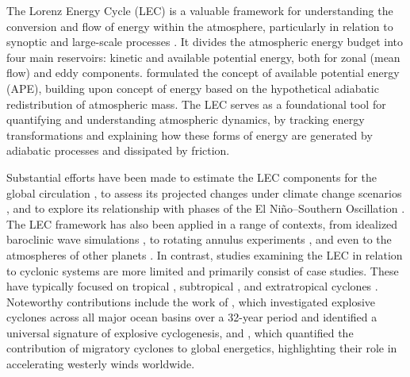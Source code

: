 \documentclass[pdflatex,sn-chicago]{sn-jnl}%
\theoremstyle{plain}
\theoremstyle{definition}
\theoremstyle{remark}
\theoremstyle{definition}
\begin{document}
The Lorenz Energy Cycle (LEC) is a valuable framework for understanding the conversion and flow of energy within the atmosphere, particularly in relation to synoptic and large-scale processes \citep{lorenz1967nature}. It divides the atmospheric energy budget into four main reservoirs: kinetic and available potential energy, both for zonal (mean flow) and eddy components. \citet{lorenz1955available} formulated the concept of available potential energy (APE), building upon \citet{margules1903energie} concept of energy based on the hypothetical adiabatic redistribution of atmospheric mass. The LEC serves as a foundational tool for quantifying and understanding atmospheric dynamics, by tracking energy transformations and explaining how these forms of energy are generated by adiabatic processes and dissipated by friction.

Substantial efforts have been made to estimate the LEC components for the global circulation \citep[e.g.,][]{muench1965dynamics,wiin1968intensity,hu2004variations,li2007lorenz,oort2018estimates}, to assess its projected changes under climate change scenarios \citep[e.g.,][]{hernandez2010energetics,veiga2013global,pan2017earth,michaelides2021lorenz}, and to explore its relationship with phases of the El Niño–Southern Oscillation \citep{gutierrez2009multivariate}. The LEC framework has also been applied in a range of contexts, from idealized baroclinic wave simulations \citep{kirshbaum2018sensitivity,rantanen2019sensitivity}, to rotating annulus experiments \citep{young2014lorenz}, and even to the atmospheres of other planets \citep[e.g.,][]{read2020baroclinic}. In contrast, studies examining the LEC in relation to cyclonic systems are more limited and primarily consist of case studies. These have typically focused on tropical \citep{brennan1980zonal,veiga2008analysis}, subtropical \citep{michaelides1987limited,dias2013synoptic,pezza2014large,cavicchia2018energetics}, and extratropical cyclones \citep{michaelides1992spatial,wahab2002mechanism,bulic2006limited,pezza2010environmental,dias2011energy}. Noteworthy contributions include the work of \citet{black2013universal}, which investigated explosive cyclones across all major ocean basins over a 32-year period and identified a universal signature of explosive cyclogenesis, and \citet{okajima2021cyclonic}, which quantified the contribution of migratory cyclones to global energetics, highlighting their role in accelerating westerly winds worldwide.
\end{document}
